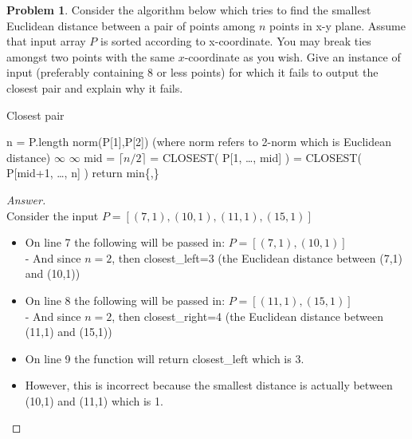 \documentclass[11pt]{article}
\theoremstyle{definition}
\theoremstyle{definition}
\newtheorem{required}{Problem}
\theoremstyle{definition}
\begin{document}
\begin{required} \label{DCcounter}
Consider the algorithm below which tries to find the  smallest Euclidean distance between a pair of points among $n$ points in x-y plane. Assume that input array $P$ is sorted according to x-coordinate. You may break ties amongst two points with the same $x$-coordinate as you wish. Give an instance of input (preferably containing 8 or less points) for which it fails to output the closest pair and explain why it fails. 
\begin{algorithm}
\caption{Closest pair}\label{alg:closestpair}
\begin{algorithmic}[1]
\State n = P.length
\Return norm(P[1],P[2])  (where norm refers to 2-norm which is Euclidean distance)
\EndIf
{}
\Return $\infty$
\EndIf
{}
\Return $\infty$
\EndIf
\State mid = $\lceil n/2 \rceil$
\State {} = CLOSEST( P[1, \ldots, mid] )
\State {} = CLOSEST( P[mid+1, \ldots, n] )
\State return min\{,\}

\EndProcedure
\end{algorithmic}
\end{algorithm}



\begin{proof}[Answer] $ $\\
Consider the input $P = [(7,1),(10,1),(11,1),(15,1)] $
\begin{itemize}
    \item On line 7 the following will be passed in: $P = [(7,1),(10,1)]$ \\
    - And since $n=2$, then closest\_left=3 (the Euclidean distance between (7,1) and (10,1)) 
    \item On line 8 the following will be passed in: $P = [(11,1),(15,1)]$ \\
    - And since $n=2$, then closest\_right=4 (the Euclidean distance between (11,1) and (15,1)) 
    \item On line 9 the function will return closest\_left which is 3. 
    \item However, this is incorrect because the smallest distance is actually between (10,1) and (11,1) which is 1. 
\end{itemize}
\end{proof}

\end{required}
\end{document}
